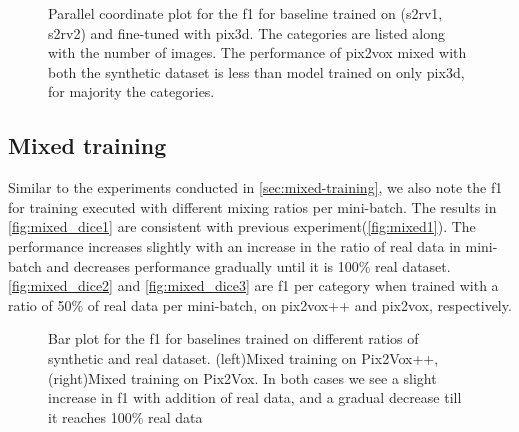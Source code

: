 \begin{figure}
    \centering
    \resizebox{0.75\textwidth}{!}{}
    \caption{Parallel coordinate plot for the \gls{f1} for baseline  trained on (\gls{s2rv1}, \gls{s2rv2}) and fine-tuned with pix3d.
    The categories are listed along with the number of images.
    The performance of pix2vox mixed with both the synthetic dataset is less than model trained on only pix3d, for majority the categories.}
    \label{fig:finetuning_dice3}
\end{figure}

\subsection{Mixed training}\label{subsec:mixed-training-dice}

Similar to the experiments conducted in \autoref{sec:mixed-training}, we also note the \gls{f1} for training executed with different mixing ratios per mini-batch.
The results in \autoref{fig:mixed_dice1} are consistent with previous experiment(\autoref{fig:mixed1}).
The performance increases slightly with an increase in the ratio of real data in mini-batch and decreases performance gradually until it is 100\% real dataset.
\autoref{fig:mixed_dice2} and \autoref{fig:mixed_dice3} are \gls{f1} per category when trained with a ratio of 50\% of real data per mini-batch, on pix2vox++ and pix2vox, respectively.

\begin{figure}
    \centering
    \resizebox{0.49\linewidth}{0.45\linewidth}{}
    \resizebox{0.49\linewidth}{0.45\linewidth}{}
    \caption{Bar plot for the \gls{f1}  for baselines trained on different ratios of synthetic and real dataset.
        (left)Mixed training on Pix2Vox++, (right)Mixed training on Pix2Vox. In both cases we see a slight increase in \gls{f1} with addition of real data, and a gradual decrease till it reaches 100\% real data}
    \label{fig:mixed_dice1}
\end{figure}

